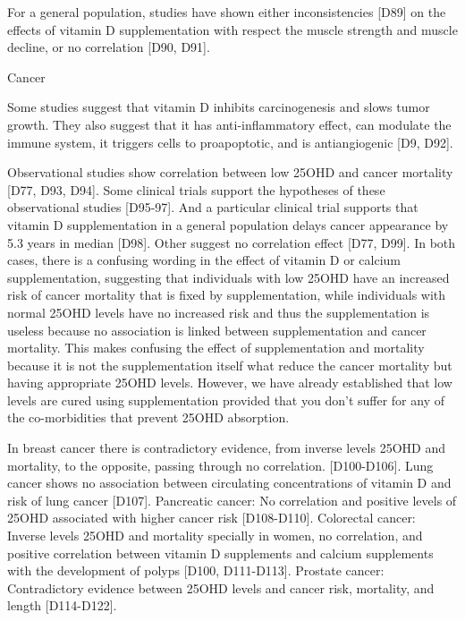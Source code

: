 

For a general population, studies have shown either inconsistencies [D89] on the effects of vitamin D supplementation with respect the muscle strength and muscle decline, or no correlation [D90, D91]. 

 

Cancer 

 

Some studies suggest that vitamin D inhibits carcinogenesis and slows tumor growth. They also suggest that it has anti-inflammatory effect, can modulate the immune system, it triggers cells to proapoptotic, and is antiangiogenic [D9, D92]. 

 

Observational studies show correlation between low 25OHD and cancer mortality [D77, D93, D94]. Some clinical trials support the hypotheses of these observational studies [D95-97]. And a particular clinical trial supports that vitamin D supplementation in a general population delays cancer appearance by 5.3 years in median [D98]. Other suggest no correlation effect [D77, D99]. In both cases, there is a confusing wording in the effect of vitamin D or calcium supplementation, suggesting that individuals with low 25OHD have an increased risk of cancer mortality that is fixed by supplementation, while individuals with normal 25OHD levels have no increased risk and thus the supplementation is useless because no association is linked between supplementation and cancer mortality. This makes confusing the effect of supplementation and mortality because it is not the supplementation itself what reduce the cancer mortality but having appropriate 25OHD levels. However, we have already established that low levels are cured using supplementation provided that you don't suffer for any of the co-morbidities that prevent 25OHD absorption. 

 

In breast cancer there is contradictory evidence, from inverse levels 25OHD and mortality, to the opposite, passing through no correlation. [D100-D106]. Lung cancer shows no association between circulating concentrations of vitamin D and risk of lung cancer [D107]. Pancreatic cancer: No correlation and positive levels of 25OHD associated with higher cancer risk [D108-D110]. Colorectal cancer: Inverse levels 25OHD and mortality specially in women, no correlation, and positive correlation between vitamin D supplements and calcium supplements with the development of polyps [D100, D111-D113]. Prostate cancer: Contradictory evidence between 25OHD levels and cancer risk, mortality, and length [D114-D122]. 

